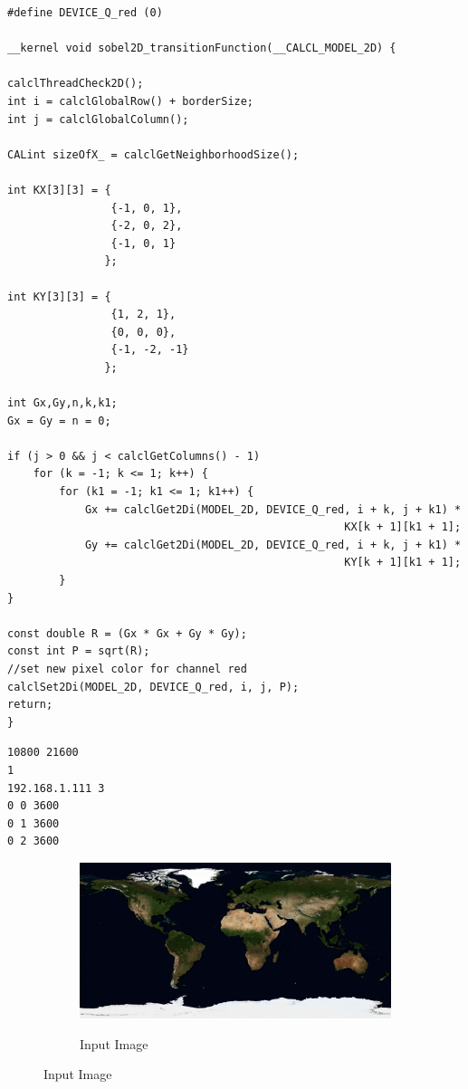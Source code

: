 {
\begin{lstlisting}
#define DEVICE_Q_red (0)

__kernel void sobel2D_transitionFunction(__CALCL_MODEL_2D) {

calclThreadCheck2D();
int i = calclGlobalRow() + borderSize;
int j = calclGlobalColumn();

CALint sizeOfX_ = calclGetNeighborhoodSize();

int KX[3][3] = {
				{-1, 0, 1},
				{-2, 0, 2},
				{-1, 0, 1}
			   };

int KY[3][3] = {
				{1, 2, 1},
				{0, 0, 0},
				{-1, -2, -1}
			   };

int Gx,Gy,n,k,k1;
Gx = Gy = n = 0;

if (j > 0 && j < calclGetColumns() - 1)
	for (k = -1; k <= 1; k++) {
		for (k1 = -1; k1 <= 1; k1++) {
			Gx += calclGet2Di(MODEL_2D, DEVICE_Q_red, i + k, j + k1) *
													KX[k + 1][k1 + 1];
			Gy += calclGet2Di(MODEL_2D, DEVICE_Q_red, i + k, j + k1) *
													KY[k + 1][k1 + 1];
		}
}

const double R = (Gx * Gx + Gy * Gy);
const int P = sqrt(R);
//set new pixel color for channel red
calclSet2Di(MODEL_2D, DEVICE_Q_red, i, j, P);
return;
}

\end{lstlisting}


\begin{lstlisting}[float]
10800 21600
1
192.168.1.111 3
0 0 3600
0 1 3600
0 2 3600
\end{lstlisting}



\begin{figure}
	\begin{subfigure}{1.0\textwidth}
		\caption{Input Image}
		\includegraphics[width=\linewidth]{./images/opencal/sobel_input}
		\label{fig:sobel_input}
		

\end{subfigure}
\end{figure}}
